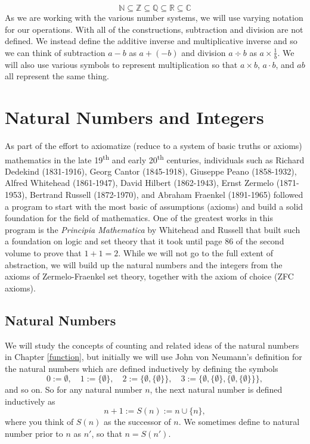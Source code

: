 \documentclass[
]{book}
\theoremstyle{definition}
\theoremstyle{definition}
\theoremstyle{definition}
\theoremstyle{definition}
\theoremstyle{remark}
\begin{document}
\[\mathbb{N} \subseteq \mathbb{Z} \subseteq \mathbb{Q} \subseteq \mathbb{R} \subseteq \mathbb{C}\]
As we are working with the various number systems, we will use varying notation for our operations. With all of the constructions, subtraction and division are not defined. We instead define the additive inverse and multiplicative inverse and so we can think of subtraction \(a-b\) as \(a+(-b)\) and division \(a\div b\) as \(a \times \frac{1}{b}\). We will also use various symbols to represent multiplication so that \(a\times b\), \(a\cdot b\), and \(ab\) all represent the same thing.

\hypertarget{Integers}{%
\section{Natural Numbers and Integers}\label{Integers}}

As part of the effort to axiomatize (reduce to a system of basic truths or axioms) mathematics in the late 19\textsuperscript{th} and early 20\textsuperscript{th} centuries, individuals such as Richard Dedekind (1831-1916), Georg Cantor (1845-1918), Giuseppe Peano (1858-1932), Alfred Whitehead (1861-1947), David Hilbert (1862-1943), Ernst Zermelo (1871-1953), Bertrand Russell (1872-1970), and Abraham Fraenkel (1891-1965) followed a program to start with the most basic of assumptions (axioms) and build a solid foundation for the field of mathematics. One of the greatest works in this program is the \emph{Principia Mathematica} by Whitehead and Russell \citetext{\citeyear{Principia1}; \citeyear{Principia2}; \citeyear{Principia3}} that built such a foundation on logic and set theory that it took until page 86 of the second volume to prove that \(1+1=2\). While we will not go to the full extent of abstraction, we will build up the natural numbers and the integers from the axioms of Zermelo-Fraenkel set theory, together with the axiom of choice (ZFC axioms).

\hypertarget{natural-numbers}{%
\subsection{Natural Numbers}\label{natural-numbers}}

We will study the concepts of counting and related ideas of the natural numbers in Chapter \ref{function}, but initially we will use John von Neumann's \citeyearpar{vonNeumann23} definition for the natural numbers which are defined inductively by defining the symbols
\[0:=\emptyset, \quad 1:=\{\emptyset\}, \quad 2:=\{\emptyset, \{\emptyset\}\}, \quad 3:=\{\emptyset, \{\emptyset\}, \{\emptyset, \{\emptyset\} \}\},\] and so on. So for any natural number \(n\), the next natural number is defined inductively as \[n+1:=S(n) := n\cup \{n\},\] where you think of \(S(n)\) as the successor of \(n\). We sometimes define to natural number prior to \(n\) as \(n'\), so that \(n=S(n')\).
\end{document}
